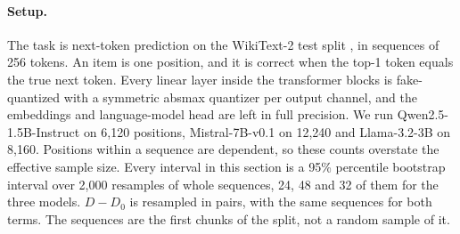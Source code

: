 \documentclass[journal,onecolumn]{IEEEtran}
\begin{document}
\paragraph{Setup.} The task is next-token prediction on the WikiText-2 test split
\citep{merity2017pointer}, in sequences of 256 tokens. An item is one position, and it is
correct when the top-1 token equals the true next token. Every linear layer inside the
transformer blocks is fake-quantized with a symmetric absmax quantizer per output channel, and
the embeddings and language-model head are left in full precision. We run
Qwen2.5-1.5B-Instruct \citep{qwen2025qwen25} on 6{,}120 positions, Mistral-7B-v0.1
\citep{jiang2023mistral} on 12{,}240 and Llama-3.2-3B \citep{grattafiori2024llama3} on
8{,}160. Positions within a sequence are dependent, so these counts overstate the effective
sample size. Every interval in this section is a 95\% percentile bootstrap interval over 2{,}000 resamples
of whole sequences, 24, 48 and 32 of them for the three models. $D - D_0$ is resampled in pairs,
with the same sequences for both terms. The sequences are the first chunks of the split, not a
random sample of it.
\end{document}
